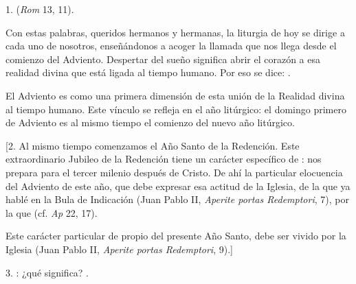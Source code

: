 				
				\begin{body}
					1.  (\emph{Rom} 13, 11). 
					
					Con estas palabras, queridos hermanos y hermanas, la liturgia de hoy se dirige a cada uno de nosotros, enseñándonos a acoger la llamada que nos llega desde el comienzo del Adviento. Despertar del sueño significa abrir el corazón a esa realidad divina que está ligada al tiempo humano. Por eso se dice: . 
					
					El Adviento es como una primera dimensión de esta unión de la Realidad divina al tiempo humano. Este vínculo se refleja en el año litúrgico: el domingo primero de Adviento es al mismo tiempo el comienzo del nuevo año litúrgico. 
					
					{[}2. Al mismo tiempo comenzamos el Año Santo de la Redención. Este extraordinario Jubileo de la Redención tiene un carácter específico de : nos prepara para el tercer milenio después de Cristo. De ahí la particular elocuencia del Adviento de este año, que debe expresar esa actitud de la Iglesia, de la que ya hablé en la Bula de Indicación (Juan Pablo II, \emph{Aperite portas Redemptori}, 7), por la que  (cf. \emph{Ap} 22, 17). 
					
					Este carácter particular de  propio del presente Año Santo, debe ser vivido por la Iglesia  (Juan Pablo II, \emph{Aperite portas Redemptori}, 9).{]} 
					
					3. : ¿qué significa? . 
					

\end{body}
